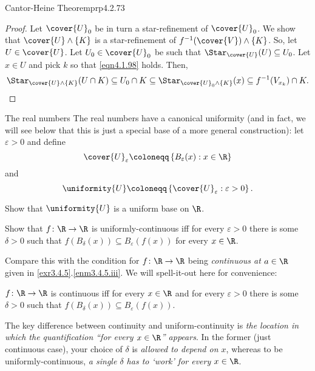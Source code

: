 \begin{prp}{Cantor-Heine Theorem}{prp4.2.73}
\begin{proof}
Let $\cover{U}_0$ be in turn a star-refinement of $\cover{U}_0$.  We show that $\cover{U}\wedge \{ K\}$ is a star-refinement of $f^{-1}(\cover{V})\wedge \{ K\}$.  So, let $U\in \cover{U}$.  Let $U_0\in \cover{U}_0$ be such that $\Star _{\cover{U}}(U)\subseteq U_0$.  Let $x\in U$ and pick $k$ so that \eqref{eqn4.1.98} holds.  Then,
\begin{equation}
\Star _{\cover{U}\wedge \{ K\}}(U\cap K)\subseteq U_0\cap K\subseteq \Star _{\cover{U}_0\wedge \{ K\}}(x)\subseteq f^{-1}(V_{x_k})\cap K.
\end{equation}
\end{proof}
\end{prp}

\horizontalrule

\begin{exm}{The real numbers}{}
The real numbers have a canonical uniformity (and in fact, we will see below that this is just a special base of a more general construction):  let $\varepsilon >0$ and define
\begin{equation}
\cover{U}_{\varepsilon}\coloneqq \left\{ B_{\varepsilon}(x):x\in \R \right\}
\end{equation}
 and
\begin{equation}
\uniformity{U}\coloneqq \left\{ \cover{U}_{\varepsilon}:\varepsilon >0\right\} .
\end{equation}
\begin{exr}[breakable=false]{}{}
Show that $\uniformity{U}$ is a uniform base on $\R$.
\end{exr}
\begin{exr}[breakable=false]{}{}
Show that $f\colon \R \rightarrow \R$ is uniformly-continuous iff for every $\varepsilon >0$ there is some $\delta >0$ such that $f(B_{\delta}(x))\subseteq B_{\varepsilon}(f(x))$ for every $x\in \R$.
\begin{rmk}
Compare this with the condition for $f\colon \R \rightarrow \R$ being \emph{continuous at $a\in \R$} given in \cref{exr3.4.5}.\cref{enm3.4.5.iii}.  We will spell-it-out here for convenience:
\begin{textequation}
$f\colon \R \rightarrow \R$ is continuous iff for every $x\in \R$ and for every $\varepsilon >0$ there is some $\delta >0$ such that $f(B_{\delta}(x))\subseteq B_{\varepsilon}(f(x))$.
\end{textequation}
The key difference between continuity and uniform-continuity is \emph{the location in which the quantification ``for every $x\in \R$'' appears}.  In the former (just continuous case), your choice of $\delta$ is \emph{allowed to depend on $x$}, whereas to be uniformly-continuous, \emph{a single $\delta$ has to `work' for every $x\in \R$}.

\end{rmk}
\end{exr}
\end{exm}
